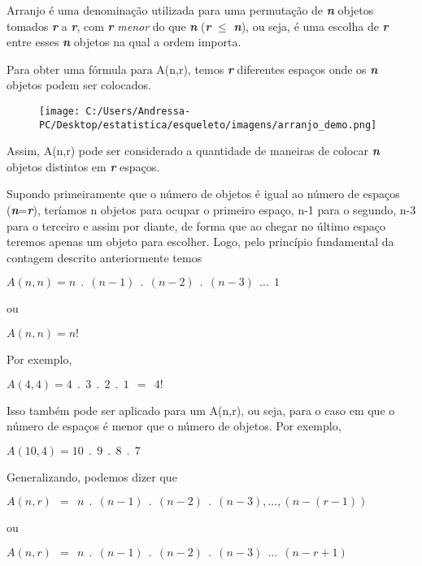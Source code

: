 Arranjo é uma denominação utilizada para uma permutação de \textbf{\textit{n}} objetos tomados \textbf{\textit{r}} a \textbf{\textit{r}}, com \textbf{\textit{r}} \textit{menor} do que \textbf{\textit{n}} (\textbf{\textit{r}} $\leq$ \textbf{\textit{n}}), ou seja, é uma escolha de \textbf{\textit{r}} entre esses \textbf{\textit{n}} objetos na qual a ordem importa.

Para obter uma fórmula para A(n,r), temos \textbf{\textit{r}} diferentes espaços onde os \textbf{\textit{n}} objetos podem ser colocados.

\begin{figure}[H]
	\centering

	\texttt{[image: C:/Users/Andressa-PC/Desktop/estatistica/esqueleto/imagens/arranjo\_demo.png]}

\end{figure}

Assim, A(n,r) pode ser considerado a quantidade de maneiras de colocar \textbf{\textit{n}} objetos distintos em \textbf{\textit{r}} espaços.

Supondo primeiramente que o número de objetos é igual ao número de espaços (\textbf{\textit{n}}=\textbf{\textit{r}}), teríamos n objetos para ocupar o primeiro espaço, n-1 para o segundo, n-3 para o terceiro e assim por diante, de forma que ao chegar no último espaço teremos apenas um objeto para escolher.
Logo, pelo princípio fundamental da contagem descrito anteriormente temos
\begin{center}
	$A(n,n)=n\ \ .\ \ (n-1)\ \ .\ \ (n-2)\ \ .\ \ (n-3)\ \ ...\ \ 1$
	
ou

	$A(n,n)=n!$
\end{center}

\noindent 
Por exemplo, 
\begin{center}
	$A(4,4)= 4\ \ .\ \ 3\ \ .\ \ 2\ \ .\ \ 1\ \ =\ \ 4!$
\end{center}
Isso também pode ser aplicado para um A(n,r), ou seja, para o caso em que o número de espaços é menor que o número de objetos. Por exemplo,
\begin{center}
	$A(10,4)= 10\ \ .\ \ 9\ \ .\ \ 8\ \ .\ \ 7$
\end{center}
Generalizando, podemos dizer que
\begin{center}
	$A(n,r)\ \ =\ \ n\ \ .\ \ (n-1)\ \ .\ \ (n-2)\ \ .\ \ (n-3),...,(n-(r-1))$

ou

	$A(n,r)\ \ =\ \ n\ \ .\ \ (n-1)\ \ .\ \ (n-2)\ \ .\ \ (n-3)\ \ ...\ \ (n-r+1)$
\end{center}


